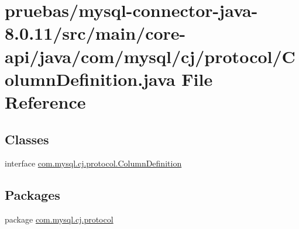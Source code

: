 \hypertarget{core-api_2java_2com_2mysql_2cj_2protocol_2_column_definition_8java}{}\section{pruebas/mysql-\/connector-\/java-\/8.0.11/src/main/core-\/api/java/com/mysql/cj/protocol/\+Column\+Definition.java File Reference}
\label{core-api_2java_2com_2mysql_2cj_2protocol_2_column_definition_8java}
\subsection*{Classes}
\begin{DoxyCompactItemize}
\item 
interface \mbox{\hyperlink{interfacecom_1_1mysql_1_1cj_1_1protocol_1_1_column_definition}{com.\+mysql.\+cj.\+protocol.\+Column\+Definition}}
\end{DoxyCompactItemize}
\subsection*{Packages}
\begin{DoxyCompactItemize}
\item 
package \mbox{\hyperlink{namespacecom_1_1mysql_1_1cj_1_1protocol}{com.\+mysql.\+cj.\+protocol}}
\end{DoxyCompactItemize}
